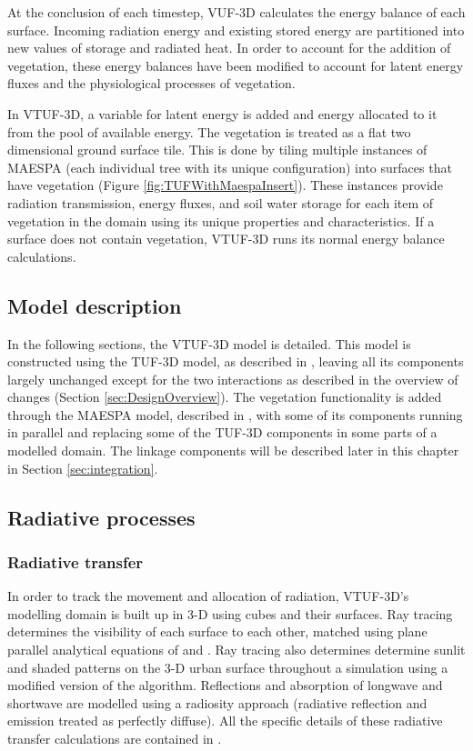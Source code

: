 \documentclass[final,3p,times,authoryear]{elsarticle}
\begin{document}
At the conclusion of each timestep, VUF-3D calculates the energy balance of each surface. Incoming radiation energy and existing stored energy are partitioned into new values of storage and radiated heat. In order to account for the addition of vegetation, these energy balances have been modified to account for latent energy fluxes and the physiological processes of vegetation. 

In VTUF-3D, a variable for latent energy is added and energy allocated to it from the pool of available energy. The vegetation is treated as a flat two dimensional ground surface tile. This is done by tiling multiple instances of MAESPA (each individual tree with its unique configuration) into surfaces that have vegetation (Figure \ref{fig:TUFWithMaespaInsert}). These instances provide radiation transmission, energy fluxes, and soil water storage for each item of vegetation in the domain using its unique properties and characteristics. If a surface does not contain vegetation, VTUF-3D runs its normal energy balance calculations. 

\subsection{Model description}
In the following sections, the VTUF-3D model is detailed. This model is constructed using the TUF-3D model, as described in \cite{Krayenhoff2007}, leaving all its components largely unchanged except for the two interactions as described in the overview of changes (Section \ref{sec:DesignOverview}). The vegetation functionality is added through the MAESPA model, described in \cite{Duursma2012}, with some of its components running in parallel and replacing some of the TUF-3D components in some parts of a modelled domain. The linkage components will be described later in this chapter in Section \ref{sec:integration}.

\subsection{Radiative processes}
\subsubsection{Radiative transfer}\label{sec:radiativetransfer}

In order to track the movement and allocation of radiation, VTUF-3D's modelling domain is built up in 3-D using cubes and their surfaces. Ray tracing determines the visibility of each surface to each other, matched using plane parallel analytical equations of \cite{Siegel2001} and \cite{Hottel1967}. Ray tracing also determines determine sunlit and shaded patterns on the 3-D urban surface throughout a simulation using a modified version of the \cite{Soux2004} algorithm. Reflections and absorption of longwave and shortwave are modelled using a radiosity approach (radiative reflection and emission treated as perfectly diffuse). All the specific details of these radiative transfer calculations are contained in \cite{Krayenhoff2007}.
\end{document}
